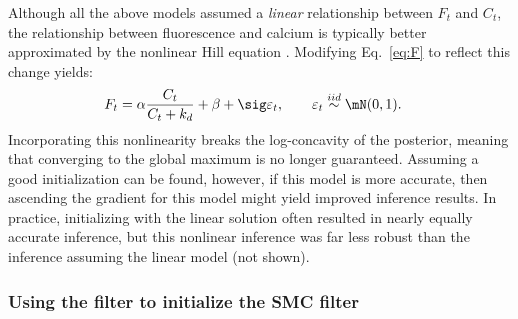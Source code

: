 Although all the above models assumed a \emph{linear} relationship between $F_t$ and $C_t$, the relationship between fluorescence and calcium is typically better approximated by the nonlinear Hill equation \cite{PologrutoSvoboda04}. Modifying Eq.~\eqref{eq:F} to reflect this change yields: 
\begin{align}
	F_t &= \alpha \frac{C_t}{C_t+k_d} + \beta +  \sig \varepsilon_t, \qquad \varepsilon_t \overset{iid}{\sim} \mN(0,1).
\end{align}
Incorporating this nonlinearity breaks the log-concavity of the posterior, meaning that converging to the global maximum is no longer guaranteed.  Assuming a good initialization can be found, however, if this model is more accurate, then ascending the gradient for this model might yield improved inference results.  In practice, initializing with the linear solution often resulted in nearly equally accurate inference, but this nonlinear inference was far less robust than the inference assuming the linear model (not shown).  

\subsubsection{Using the \foopsi filter to initialize the SMC filter}


